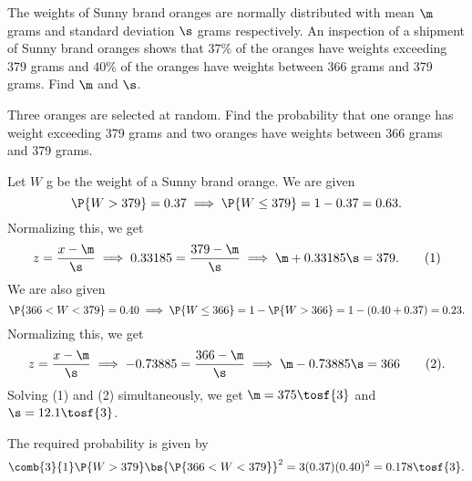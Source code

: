 \clearpage
\begin{problem}
    The weights of Sunny brand oranges are normally distributed with mean $\m$ grams and standard deviation $\s$ grams respectively. An inspection of a shipment of Sunny brand oranges shows that 37\% of the oranges have weights exceeding 379 grams and 40\% of the oranges have weights between 366 grams and 379 grams. Find $\m$ and $\s$.

    Three oranges are selected at random. Find the probability that one orange has weight exceeding 379 grams and two oranges have weights between 366 grams and 379 grams.
\end{problem}
\begin{solution}
    Let $W$ g be the weight of a Sunny brand orange. We are given \[\P{W > 379} = 0.37 \implies \P{W \leq 379} = 1 - 0.37 = 0.63.\] Normalizing this, we get \[z = \frac{x - \m}{\s} \implies 0.33185 = \frac{379 - \m}{\s} \implies \m + 0.33185 \s = 379. \tag{1}\] We are also given \[\P{366 < W < 379} = 0.40 \implies \P{W \leq 366} = 1 - \P{W > 366} = 1 - (0.40 + 0.37) = 0.23.\] Normalizing this, we get \[z = \frac{x - \m}{\s} \implies -0.73885 = \frac{366 - \m}{\s} \implies \m - 0.73885 \s = 366 \tag{2}.\] Solving (1) and (2) simultaneously, we get $\m = 375 \tosf{3}$ and $\s = 12.1 \tosf{3}$.

    The required probability is given by \[\comb{3}{1} \P{W > 379} \bs{\P{366 < W < 379}}^2 = 3 (0.37) (0.40)^2 = 0.178 \tosf{3}.\]
\end{solution}


